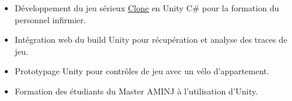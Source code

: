 \documentclass[10pt,a4paper]{altacv}
\begin{document}
\hypersetup{urlcolor=links} 



\begin{fullwidth}
\makecvheader
\end{fullwidth}





\begin{itemize}
\item Développement du jeu sérieux \underline{\href{https://www.univ-jfc.fr/actu/clone-un-serious-game-dedie-lorganisation-du-travail-en-milieu-hospitalier}{Clone}} en Unity C\# pour la formation du personnel infirmier.
\item Intégration web du build Unity pour récupération et analyse des traces de jeu.
\item Prototypage Unity pour contrôles de jeu avec un vélo d'appartement.
\item Formation des étudiants du Master AMINJ à l'utilisation d'Unity.
\end{itemize}
\end{document}
